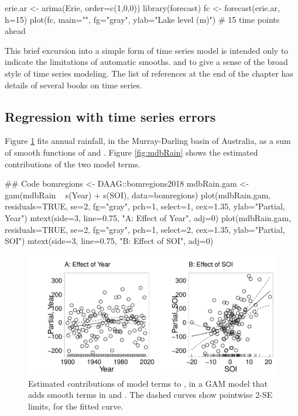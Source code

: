 \begin{marginfigure}[-5cm]
\begin{Schunk}
\begin{Sinput}
erie.ar <- arima(Erie,
            order=c(1,0,0))
library(forecast)
fc <- forecast(erie.ar,
               h=15)
plot(fc, main="", fg="gray",
     ylab="Lake level (m)")
  # 15 time points ahead
\end{Sinput}
\end{Schunk}
\end{marginfigure}

This brief excursion into a simple form of time series model is
intended only to indicate the limitations of automatic smooths.  and
to give a sense of the broad style of time series modeling.  The list
of references at the end of the chapter has details of several books
on time series.

\subsection{Regression with time series errors}

Figure \ref{fig:mdbRainSM} fits annual rainfall, in the Murray-Darling basin of
Australia, as a sum of smooth functions of  and .
Figure \ref{fig:mdbRain} shows the estimated contributions of the two
model terms.
\begin{Schunk}
\begin{Sinput}
## Code
bomregions <- DAAG::bomregions2018
mdbRain.gam <- gam(mdbRain ~ s(Year) + s(SOI),
                   data=bomregions)
plot(mdbRain.gam, residuals=TRUE, se=2, fg="gray",
     pch=1, select=1, cex=1.35, ylab="Partial, Year")
mtext(side=3, line=0.75, "A: Effect of Year", adj=0)
plot(mdbRain.gam, residuals=TRUE, se=2, fg="gray",
     pch=1, select=2, cex=1.35, ylab="Partial, SOI")
mtext(side=3, line=0.75, "B: Effect of SOI", adj=0)
\end{Sinput}
\end{Schunk}
\begin{figure}
\begin{Schunk}


\centerline{\includegraphics[width=\textwidth]{figs/9-mdb-gam-1} }

\end{Schunk}
  \caption{Estimated contributions of model terms to
    , in a GAM model that adds smooth terms in
     and . The dashed curves show pointwise
    2-SE limits, for the fitted curve.}\label{fig:mdbRainSM}
\end{figure}

